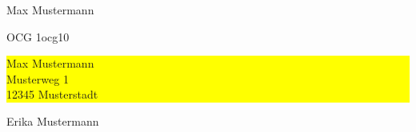 \documentclass[a4paper]{minimal}
\begin{document}
Max Mustermann \begin{ocg}{OCG 1}{ocg1}{0}
  \colorbox{yellow}{ \parbox{5cm}{Max Mustermann\\Musterweg 1\\12345 Musterstadt}}
\end{ocg}

Erika Mustermann
\end{document}
